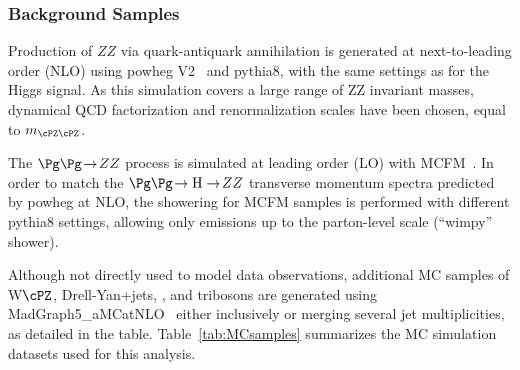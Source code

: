 \subsubsection{Background Samples}

Production of $ZZ$ via quark-antiquark annihilation is generated at
next-to-leading order (NLO) using {\sc powheg V2}~\cite{Nason:2013ydw}
and {\sc pythia8}, with 
the same settings as for the Higgs signal. As this simulation covers a large
range of ZZ invariant masses, dynamical QCD factorization and renormalization
scales have been chosen, equal to $m_{\cPZ\cPZ}$. 

The $\Pg\Pg \! \to \! ZZ$ process is simulated at leading order (LO) 
with MCFM~\cite{MCFM,Campbell:2013una}. In order to match the 
$\Pg\Pg \! \to \mathrm{H} \to \! ZZ$ transverse momentum spectra predicted 
by {\sc powheg} at NLO, the showering for MCFM samples is performed with 
different {\sc pythia8} settings, allowing only emissions up to the parton-level scale
(``wimpy'' shower).

Although not directly used to model data observations, additional 
MC samples of W$\cPZ$, Drell-Yan+jets, \ttbar, and tribosons are
generated using {\sc MadGraph5\_aMCatNLO}~\cite{Alwall:2014hca} either
inclusively or merging several jet multiplicities, as detailed in the table.
Table~\ref{tab:MCsamples} summarizes the MC simulation datasets used for this analysis. 


